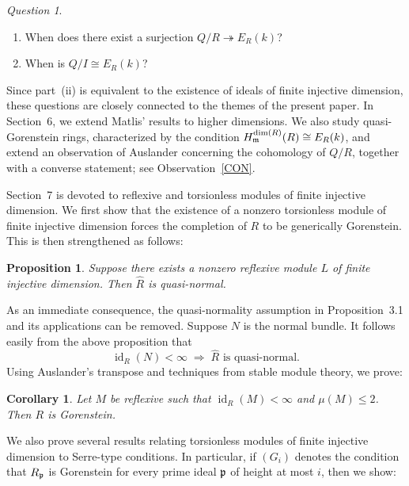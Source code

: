 \documentclass[10. pt,a4paper]{amsart}
\newtheorem{proposition}[theorem]{Proposition}
\newtheorem{corollary}[theorem]{Corollary}
\theoremstyle{definition}
\theoremstyle{remark}
\newtheorem{question}[theorem]{Question}
\newcommand{\fm}{\frak{m}}
\newcommand{\fp}{\frak{p}}
\begin{document}
\begin{question}\label{16}
	\begin{enumerate}
		\item[(i)] When does there exist a surjection $Q/R\twoheadrightarrow E_R(k)$?
		
		\item[(ii)] When is $Q/I\cong E_R(k)$?
	\end{enumerate}
\end{question}

Since part~(ii) is equivalent to the existence of ideals of finite injective dimension, these questions are closely connected to the themes of the present paper. In Section~6, we extend Matlis' results to higher dimensions. We also study quasi-Gorenstein rings, characterized by the condition $H^{\dim(R)}_{\fm}(R)\cong E_R(k)$, and extend an observation of Auslander \cite{comment} concerning the cohomology of $Q/R$, together with a converse statement; see Observation~\ref{CON}.


\medskip
Section~7 is devoted to reflexive and torsionless modules of finite injective dimension. We first show that the existence of a nonzero torsionless module of finite injective dimension forces the completion of $R$ to be generically Gorenstein. This is then strengthened as follows:

\begin{proposition}
	Suppose there exists a nonzero reflexive module $L$ of finite injective dimension. Then $\widehat{R}$ is quasi-normal.
\end{proposition}

As an immediate consequence, the quasi-normality assumption in Proposition~3.1 and its applications can be removed. Suppose $N$ is the normal bundle. It follows easily from the above proposition that
\[
\operatorname{id}_R(N) < \infty \;\Longrightarrow\; \widehat{R} \text{ is quasi-normal}.
\]
Using Auslander's transpose and techniques from stable module theory, we prove:

\begin{corollary}
	Let $M$ be reflexive such that $\operatorname{id}_R(M) < \infty$ and $\mu(M) \le 2$. Then $R$ is Gorenstein.
\end{corollary}

We also prove several results relating torsionless modules of finite injective dimension to Serre-type conditions. In particular, if $(G_i)$ denotes the condition that $R_{\fp}$ is Gorenstein for every prime ideal $\fp$ of height at most $i$, then we show:
\end{document}
